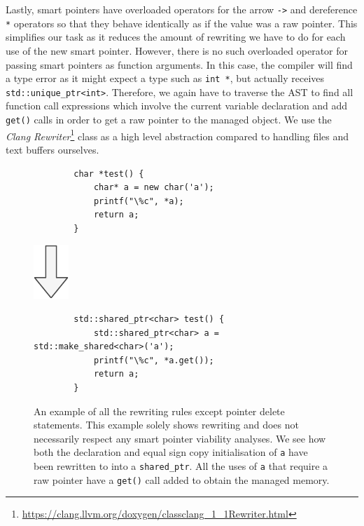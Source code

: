 \documentclass{mpaper}
\begin{document}
    Lastly, smart pointers have overloaded operators for the arrow \texttt{->} and dereference \texttt{*} operators so that they behave identically as if the value was a raw pointer.
    This simplifies our task as it reduces the amount of rewriting we have to do for each use of the new smart pointer.
    However, there is no such overloaded operator for passing smart pointers as function arguments. 
    In this case, the compiler will find a type error as it might expect a type such as \texttt{int *}, but actually receives \texttt{std::unique_ptr<int>}. 
    Therefore, we again have to traverse the AST to find all function call expressions which involve the current variable declaration and add \texttt{get()} calls in order to get a raw pointer to the managed object.
    We use the \emph{Clang Rewriter}\footnote{\url{https://clang.llvm.org/doxygen/classclang_1_1Rewriter.html}} class as a high level abstraction compared to handling files and text buffers ourselves.
    
    \begin{figure}
        \centering
        \begin{verbatim}
        char *test() {
            char* a = new char('a');
            printf("\%c", *a);
            return a;
        }
        \end{verbatim}
        
        \includegraphics{images/arrow.pdf}
        
        \begin{verbatim}
        std::shared_ptr<char> test() {
            std::shared_ptr<char> a = std::make_shared<char>('a');
            printf("\%c", *a.get());
            return a;
        }
        \end{verbatim}
        
        \caption{An example of all the rewriting rules except pointer delete statements. This example solely shows rewriting and does not necessarily respect any smart pointer viability analyses. We see how both the declaration and equal sign copy initialisation of \texttt{a} have been rewritten to into a \texttt{shared\_ptr}. All the uses of \texttt{a}  that require a raw pointer have a \texttt{get()} call added to obtain the managed memory.}
        \label{fig:rewriting}
    \end{figure}
    
\end{document}
